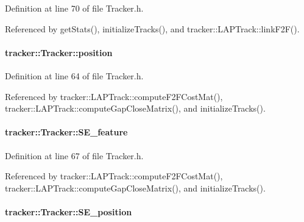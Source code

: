 Definition at line 70 of file Tracker.\+h.



Referenced by get\+Stats(), initialize\+Tracks(), and tracker\+::\+L\+A\+P\+Track\+::link\+F2\+F().

\paragraph[{\texorpdfstring{position}{position}}]{ tracker\+::\+Tracker\+::position}\hypertarget{classtracker_1_1Tracker_a89978ed5ec72607820f45f3dcf63dd04}{}\label{classtracker_1_1Tracker_a89978ed5ec72607820f45f3dcf63dd04}


Definition at line 64 of file Tracker.\+h.



Referenced by tracker\+::\+L\+A\+P\+Track\+::compute\+F2\+F\+Cost\+Mat(), tracker\+::\+L\+A\+P\+Track\+::compute\+Gap\+Close\+Matrix(), and initialize\+Tracks().

\paragraph[{\texorpdfstring{S\+E\+\_\+feature}{SE_feature}}]{ tracker\+::\+Tracker\+::\+S\+E\+\_\+feature}\hypertarget{classtracker_1_1Tracker_a0aa2719b06bfd7b630628486b67ca5fd}{}\label{classtracker_1_1Tracker_a0aa2719b06bfd7b630628486b67ca5fd}


Definition at line 67 of file Tracker.\+h.



Referenced by tracker\+::\+L\+A\+P\+Track\+::compute\+F2\+F\+Cost\+Mat(), tracker\+::\+L\+A\+P\+Track\+::compute\+Gap\+Close\+Matrix(), and initialize\+Tracks().

\paragraph[{\texorpdfstring{S\+E\+\_\+position}{SE_position}}]{ tracker\+::\+Tracker\+::\+S\+E\+\_\+position}\hypertarget{classtracker_1_1Tracker_acd4e8651a05dff9170230149b7fe0029}{}\label{classtracker_1_1Tracker_acd4e8651a05dff9170230149b7fe0029}


